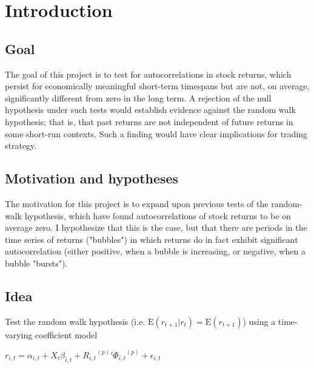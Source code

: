 \documentclass{article}
\begin{document}
\section{Introduction}

\subsection*{Goal}
The goal of this project is to test for autocorrelations in stock returns, which persist for economically meaningful short-term timespans but are not, on average, significantly different from zero in the long term. A rejection of the null hypothesis under such tests would establish evidence against the random walk hypothesis; that is, that past returns are not independent of future returns in some short-run contexts. Such a finding would have clear implications for trading strategy.

\subsection*{Motivation and hypotheses}
The motivation for this project is to expand upon previous tests of the random-walk hypothesis, which have found autocorrelations of stock returns to be on average zero. I hypothesize that this is the case, but that there are periods in the time series of returns ("bubbles") in which returns do in fact exhibit significant autocorrelation (either positive, when a bubble is increasing, or negative, when a bubble "bursts").

\subsection*{Idea}
Test the random walk hypothesis (i.e. \(\mathrm{E}(r_{t+1} | r_{t}) = \mathrm{E}(r_{t+1})\)) using a time-varying coefficient model
\newline
\begin{center}\(r_{i,t} = \alpha_{i,t} + X_{t}\beta_{i,t} + {{R_{i,t}}^{(p)}}' {\Phi_{i,t}}^{(p)} + \epsilon_{i,t}\)\end{center}
\end{document}

